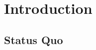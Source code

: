 \chapter{Introduction} %

\label{chapter:introduction} %


\newcommand{\keyword}[1]{\textbf{#1}}
\newcommand{\tabhead}[1]{\textbf{#1}}
\newcommand{\code}[1]{\texttt{#1}}
\newcommand{\file}[1]{\texttt{\bfseries#1}}
\newcommand{\option}[1]{\texttt{\itshape#1}}

\section{Status Quo}
